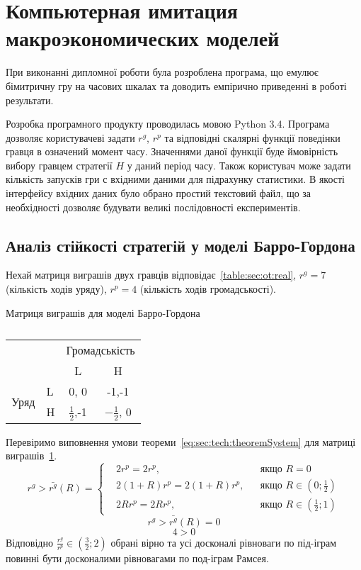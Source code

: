 \section{Компьютерная имитация макроэкономических моделей } 

При виконанні дипломної роботи була розроблена програма, що емулює бімитричну гру на часових шкалах та доводить емпірично приведенні в роботі результати. 

Розробка програмного продукту проводилась мовою Python 3.4.
Програма дозволяє користувачеві задати $r^g$, $r^p$ та відповідні скалярні функції поведінки гравця в означений момент часу. Значеннями даної функції буде ймовірність вибору гравцем стратегії $H$ у даний період часу. Також користувач може задати кількість запусків гри с вхідними даними для підрахунку статистики. В якості інтерфейсу вхідних даних було обрано простий текстовий файл, що за необхідності дозволяє будувати великі послідовності експериментів.

\subsection{Аналіз стійкості стратегій у моделі Барро-Гордона}
Нехай матриця виграшів двух гравців відповідає~\ref{table:sec:ot:real},
$r^g= 7$ (кількість ходів уряду), $r^p= 4$ (кількість ходів громадськості).

\begin{table}[h]
	\centering
	
	\caption{}	
			 Матриця виграшів для моделі Барро-Гордона\\
			\normalsize
			
\begin{tabular}{|l|l|c|c|}
	\hline
	\multicolumn{2}{|l|}{\multirow{2}{*}{}} & \multicolumn{2}{l|}{Громадськість} \\ \cline{3-4} 
	\multicolumn{2}{|l|}{}                  & L                & H                \\ \hline
	\multirow{2}{*}{Уряд}    & L   & 0, 0             & -1,-1            \\ \cline{2-4} 
	& H   & $\frac{1}{2}$,-1             & $-\frac{1}{2}$, 0            \\ \hline
\end{tabular}

	\label{table:sec:ot:real1}
\end{table}

Перевіримо виповнення умови теореми~\ref{eq:sec:tech:theoremSystem} для матриці виграшів~\ref{table:sec:ot:real1}. 
$$
r^g> \bar{r^g}(R) = \left\{ 
\begin{aligned} 
&2r^p= 2r^p, &&\text{якщо } R=0
\\
&2(1+R)r^p= 2(1+R)r^p, &&\text{якщо } 	R\in\left(0; \frac{1}{2}\right)
\\
&2Rr^p= 2Rr^p, &&\text{якщо } 	R\in\left( \frac{1}{2};1\right)
\end{aligned}
\right.		
$$
$$
r^g> \bar{r^g}(R) = 0$$
$$
4 > 0
$$
Відповідно $\frac{r^g}{r^p} \in \left(\frac{3}{2};2\right)$ обрані вірно та усі досконалі рівноваги по під-іграм повинні бути досконалими рівновагами по под-іграм Рамсея.
 
